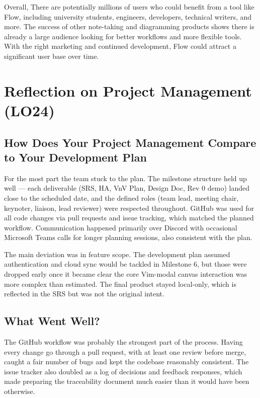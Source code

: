 \documentclass{article}
\begin{document}
\vspace{0.5em}

Overall, There are potentially millions of users who could benefit from a tool 
like Flow, including university students, engineers, developers, technical writers,
and more. The success of other note-taking and diagramming products shows there is 
already a large audience looking for better workflows and more flexible tools. With 
the right marketing and continued development, Flow could attract a significant 
user base over time.

\section{Reflection on Project Management (LO24)}


\subsection{How Does Your Project Management Compare to Your Development Plan}

For the most part the team stuck to the plan. The milestone structure held up well --- each deliverable (SRS, HA, VnV Plan, Design Doc, Rev 0 demo) landed close to the scheduled date, and the defined roles (team lead, meeting chair, keynoter, liaison, lead reviewer) were respected throughout. GitHub was used for all code changes via pull requests and issue tracking, which matched the planned workflow. Communication happened primarily over Discord with occasional Microsoft Teams calls for longer planning sessions, also consistent with the plan.

The main deviation was in feature scope. The development plan assumed authentication and cloud sync would be tackled in Milestone 6, but those were dropped early once it became clear the core Vim-modal canvas interaction was more complex than estimated. The final product stayed local-only, which is reflected in the SRS but was not the original intent.

\subsection{What Went Well?}

The GitHub workflow was probably the strongest part of the process. Having every change go through a pull request, with at least one review before merge, caught a fair number of bugs and kept the codebase reasonably consistent. The issue tracker also doubled as a log of decisions and feedback responses, which made preparing the traceability document much easier than it would have been otherwise.
\end{document}
